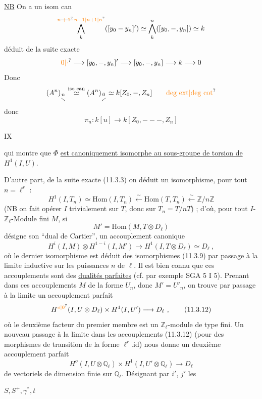 \uline{NB} On a un isom can
\[
 \bigwedge_k^{\deleted{\unsure{n+1}}\,\unsure{n-1|n+1|n}}([y_0-y_n]')\simeq\bigwedge_k^n([y_0,-,y_n])\simeq k
\]
déduit de la suite exacte
\[
 \unsure{0|\cdot}\longrightarrow[y_0,-,y_n]'\longrightarrow[y_0,-,y_n]\longrightarrow k\longrightarrow0
\]
Donc
\[
 (A^n)_{\underset{\searrow}{n}}\mathrel{\overset{\text{iso can}}{\simeq}}(A^n)_{\underset{\swarrow}{0}}\simeq k[Z_0,-,Z_n]
 \qquad\text{\unsure{deg ext|deg cot}}
\]
donc
\[
 \pi_n:k[u]\longrightarrow k[Z_0,---,Z_n]
\]

\hfill IX

qui montre que $\Phi$ \uline{est canoniquement isomorphe au sous-groupe de torsion de} $H^1(I,U)$.

D'autre part, de la suite exacte (11.3.3) on déduit un isomorphisme, pour tout $n=\ell^r$ :
\[
 H^1(I,T_n)\simeq\mathrm{Hom}(I,T_n)\overset{\sim}{\longleftarrow}\mathrm{Hom}(T,T_n)\overset{\sim}{\longleftarrow}\mathbb Z/n\mathbb Z \tag*{(11.3.9)}
\]
(NB on fait opérer $I$ trivialement sur $T$, donc sur $T_n=T/nT$) ; d'où, pour tout $I$-$\mathbb Z_\ell$-Module fini $M$, si
\[
 M'=\mathrm{Hom}(M,T\otimes D_\ell) \tag*{(11.3.10)}
\]
désigne son ``dual de Cartier'', un accouplement canonique
\[
 H^i(I,M)\otimes H^{1-i}(I,M')\longrightarrow H^1(I,T\otimes D_\ell)\simeq D_\ell\ ,\tag*{(11.3.11)}
\]
où le dernier isomorphisme est déduit des isomorphismes (11.3.9) par passage à la limite inductive sur les puissances $n$ de $\ell$. Il est bien connu que ces accouplements sont des \uline{dualités parfaites} (cf. par exemple SGA 5 I 5). Prenant dans ces accouplements $M$ de la forme $U_n$, donc $M'=U'_n$, on trouve par passage à la limite un accouplement parfait
\[
 H^{\unsure{o|0}}(I,U\otimes D_\ell)\times H^1(I,U')\longrightarrow D_\ell\ ,\tag*{(11.3.12)}
\]
où le deuxième facteur du premier membre est un $\mathbb Z_\ell$-module de type fini. Un nouveau passage à la limite dans les accouplements (11.3.12) (pour des morphismes de transition de la forme $\ell^r.\mathrm{id}$) nous donne un deuxième accouplement parfait
\[
 H^o(I,U\otimes\mathbb Q_\ell)\times H^1(I,U'\otimes\mathbb Q_\ell)\longrightarrow D_\ell \tag*{(11.3.13)}
\]
de vectoriels de dimension finie sur $\mathbb Q_\ell$. Désignant par $i'$, $j'$ les

$S,S^+,\gamma^*,t$

